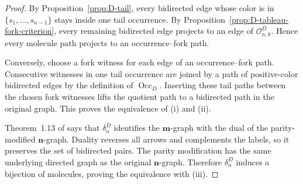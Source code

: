 \documentclass[11pt]{article}
\theoremstyle{definition}
\theoremstyle{remark}
\newcommand{\Occ}{\operatorname{Occ}}
\newcommand{\cO}{\mathcal O}
\newcommand{\mgraph}{\mathbf m}
\newcommand{\ngraph}{\mathbf n}
\begin{document}
\begin{proof}
By Proposition~\ref{prop:D-tail}, every bidirected edge whose color is in
$\{s_1,\ldots,s_{n-1}\}$ stays inside one tail occurrence.  By
Proposition~\ref{prop:D-tableau-fork-criterion}, every
remaining bidirected edge projects to an edge of $\cO^D_{n,k}$.  Hence
every molecule path projects to an occurrence--fork path.

Conversely, choose a fork witness for each edge of an
occurrence--fork path.  Consecutive witnesses in one tail occurrence are
joined by a path of positive-color bidirected edges by the definition of
$\Occ_D$.  Inserting these tail paths between the chosen fork witnesses
lifts the quotient path to a bidirected path in the original graph.  This
proves the equivalence of \textup{(i)} and \textup{(ii)}.

Theorem~1.13 of \cite{MZGelfand} says that $\delta_n^D$ identifies the
$\mgraph$-graph with the dual of the parity-modified $\ngraph$-graph.
Duality reverses all arrows and complements the labels, so it preserves
the set of bidirected pairs.  The parity modification has the same
underlying directed graph as the original $\ngraph$-graph.  Therefore
$\delta_n^D$ induces a bijection of molecules, proving the equivalence
with \textup{(iii)}.
\end{proof}
\end{document}
